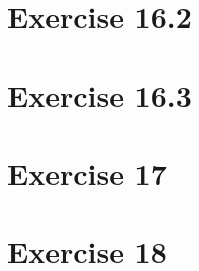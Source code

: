 \documentclass[11pt]{article} %
\begin{document}
\section*{Exercise 16.2}

\section*{Exercise 16.3}

\section*{Exercise 17}

\section*{Exercise 18}
\end{document}
